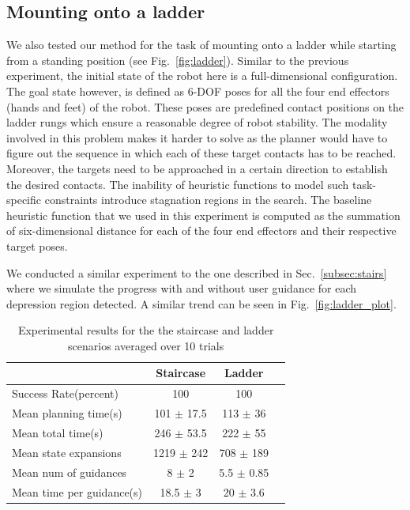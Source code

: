 \documentclass[conference]{IEEEtran}
\begin{document}
\subsection{Mounting onto a ladder}
We also tested our method for the task of mounting onto a ladder while starting from a standing position (see Fig.~\ref{fig:ladder}). Similar to the previous experiment, the initial state of the robot here is a full-dimensional configuration. The goal state however, is defined as 6-DOF poses for all the four end effectors (hands and feet) of the robot. These poses are predefined contact positions on the ladder rungs which ensure a reasonable degree of robot stability. The modality involved in this problem makes it harder to solve as the planner would have to figure out the sequence in which each of these target contacts has to be reached. Moreover, the targets need to be approached in a certain direction to establish the desired contacts. The inability of heuristic functions to model such task-specific constraints introduce stagnation regions in the search. 
The baseline heuristic function that we used in this experiment is computed as the summation of six-dimensional  distance for each of the four end effectors and their respective target poses.

We conducted a similar experiment to the one described in Sec.~\ref{subsec:stairs} where we simulate the progress with and without user guidance for each depression region detected.
A similar trend can be seen in Fig.~\ref{fig:ladder_plot}.


\begin{table}[t!]
\centering
\begin{tabular}{l|ccc}	
      & Staircase & Ladder\\ 
        \hline
            Success Rate(percent) & 100 & 100\\
            Mean planning time(s) & 101 $\pm$ 17.5 & 113 $\pm$ 36\\
            Mean total time(s) & 246 $\pm$ 53.5 & 222 $\pm$ 55\\
       Mean state expansions & 1219 $\pm$ 242 & 708 $\pm$ 189\\
      Mean num of guidances & 8 $\pm$ 2 & 5.5 $\pm$ 0.85\\
      Mean time per guidance(s) & 18.5 $\pm$ 3 & 20 $\pm$ 3.6\\
\end{tabular}
\caption{Experimental results for the the staircase and ladder scenarios averaged over 10 trials}\label{tab:stats}
\end{table}
\end{document}
